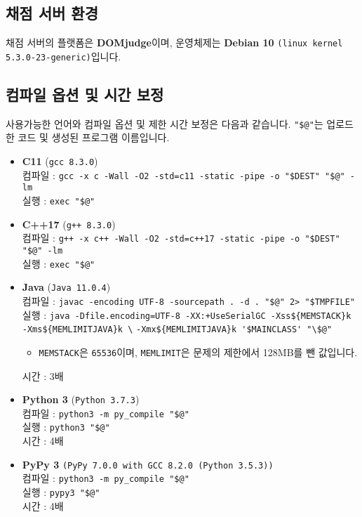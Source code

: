 \subsection*{채점 서버 환경}
채점 서버의 플랫폼은 \textbf{DOMjudge}이며, 운영체제는 \textbf{Debian 10} \texttt{(linux kernel 5.3.0-23-generic)}입니다.

\subsection*{컴파일 옵션 및 시간 보정}
사용가능한 언어와 컴파일 옵션 및 제한 시간 보정은 다음과 같습니다. \verb|"$@"|는 업로드한 코드 및 생성된 프로그램 이름입니다.
\begin{itemize}
    \item \textbf{C11} (\texttt{gcc 8.3.0})\\
    컴파일 : \verb|gcc -x c -Wall -O2 -std=c11 -static -pipe -o "$DEST" "$@" -lm|\\
    실행 : \verb|exec "$@"|
    \item \textbf{C++17} (\texttt{g++ 8.3.0})\\
    컴파일 : \verb|g++ -x c++ -Wall -O2 -std=c++17 -static -pipe -o "$DEST" "$@" -lm|\\
    실행 : \verb|exec "$@"|
    \item \textbf{Java} (\texttt{Java 11.0.4})\\
    컴파일 : \verb|javac -encoding UTF-8 -sourcepath . -d . "$@" 2> "$TMPFILE"|\\
    실행 : \verb|java -Dfile.encoding=UTF-8 -XX:+UseSerialGC -Xss${MEMSTACK}k -Xms${MEMLIMITJAVA}k \|
    \verb|-Xmx${MEMLIMITJAVA}k '$MAINCLASS' "\$@"|
    \begin{itemize}
        \item \verb|MEMSTACK|은 \verb|65536|이며, \verb|MEMLIMIT|은 문제의 제한에서 128MB를 뺀 값입니다.
    \end{itemize}
    시간 : 3배
    \item \textbf{Python 3} (\texttt{Python 3.7.3})\\
    컴파일 : \verb|python3 -m py_compile "$@"|\\
    실행 : \verb|python3 "$@"|\\
    시간 : 4배
    \item \textbf{PyPy 3} \texttt{(PyPy 7.0.0 with GCC 8.2.0 (Python 3.5.3))}\\
    컴파일 : \verb|python3 -m py_compile "$@"|\\
    실행 : \verb|pypy3 "$@"|\\
    시간 : 4배
\end{itemize}